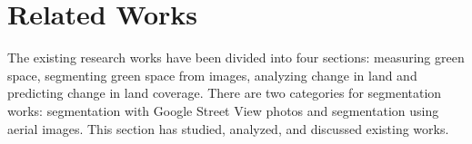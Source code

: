
 \section{Related Works}

 The existing research works have been divided into four sections: measuring green space, segmenting green space from images, analyzing change in land and predicting change in land coverage. There are two categories for segmentation works: segmentation with Google Street View photos and segmentation using aerial images. This section has studied, analyzed, and discussed existing works. 

